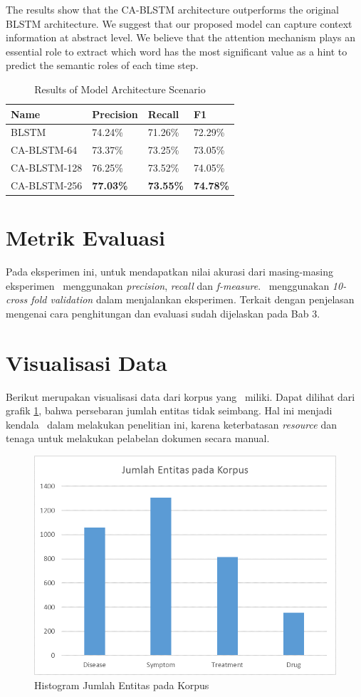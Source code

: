 The results show that the CA-BLSTM architecture outperforms the original BLSTM architecture. We suggest that our proposed model can capture context information at abstract level. We believe that the attention mechanism plays an essential role to extract which word has the most significant value as a hint to predict the semantic roles of each time step.

\begin{table}
	\caption{Results of Model Architecture Scenario}
	\label{tab:architecture_scenario}
	\begin{tabular}{llll}
		\toprule
		Name			&Precision					&Recall		&F1			\\
		\midrule
		BLSTM				&	74.24\%				&	71.26\%				&	72.29\%	\\
		CA-BLSTM-64			&	73.37\%				&	73.25\%				&	73.05\%	\\
		CA-BLSTM-128		&	76.25\%				&	73.52\%				&	74.05\%	\\
		CA-BLSTM-256		&	\textbf{77.03\%}	&	\textbf{73.55\%}	&	\textbf{74.78\%}\\
		\bottomrule
	\end{tabular}
\end{table}
\section{Metrik Evaluasi}
Pada eksperimen ini, untuk mendapatkan nilai akurasi dari masing-masing eksperimen \saya~menggunakan \textit{precision}, \textit{recall} dan \textit{f-measure}. \Saya~menggunakan \textit{10-cross fold validation} dalam menjalankan eksperimen. Terkait dengan penjelasan mengenai cara penghitungan dan evaluasi sudah dijelaskan pada Bab 3.

\section{Visualisasi Data}
Berikut merupakan visualisasi data dari korpus yang \saya~miliki. Dapat dilihat dari grafik \ref{fig:korpus}, bahwa persebaran jumlah entitas tidak seimbang. Hal ini menjadi kendala \saya~dalam melakukan penelitian ini, karena keterbatasan \textit{resource} dan tenaga untuk melakukan pelabelan dokumen secara manual.
\begin{figure}
	\centering
	\includegraphics[width=0.85\linewidth]{images/histogramentitaskorpus}
	\caption{Histogram Jumlah Entitas pada Korpus}
	\label{fig:korpus}
\end{figure}

